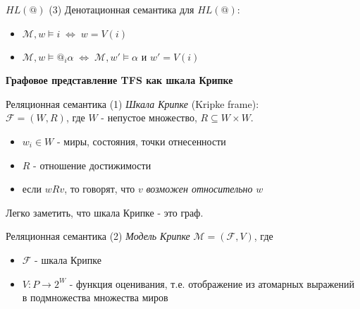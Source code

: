 \documentclass{beamer}
\begin{document}
\begin{frame}{$HL(@)$ (3)}
Денотационная семантика для $HL(@)$:\\
\bigskip
\begin{itemize}
	\item $\mathcal{M}, w \models i \; \Leftrightarrow \; w = V(i)$
	\item $\mathcal{M}, w \models @_i \alpha \; \Leftrightarrow \; \mathcal{M}, w' \models \alpha$ и $w' = V(i)$
\end{itemize}
\end{frame}

\begin{frame}{}
\begin{center}
	\textbf{Графовое представление TFS как шкала Крипке}
\end{center}
\end{frame}

\begin{frame}{Реляционная семантика (1)}
\textit{Шкала Крипке} (Kripke frame):\\
\bigskip
$\mathcal{F} = (W, R)$, где $W$ - непустое множество, $R \subseteq W \times W$.\\
\bigskip
\begin{itemize}
  \item $w_i \in W$ - миры, состояния, точки отнесенности
  \item $R$ - отношение достижимости
  \item если $wRv$, то говорят, что $v$ \textit{возможен относительно} $w$
\end{itemize}
\bigskip
Легко заметить, что шкала Крипке - это граф.
\end{frame}

\begin{frame}{Реляционная семантика (2)}
\textit{Модель Крипке} $\mathcal{M} = (\mathcal{F}, V)$, где  
\bigskip
\begin{itemize}
  \item $\mathcal{F}$ - шкала Крипке
  \item $V : P \to 2^W$ - функция оценивания, т.е. отображение из атомарных выражений в подмножества множества миров
\end{itemize}
\bigskip
\end{frame}
\end{document}
